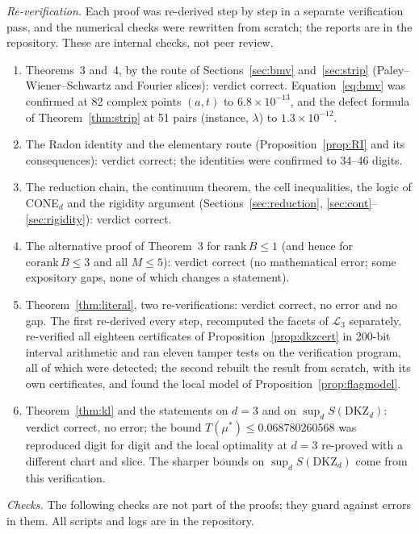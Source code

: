\documentclass[11pt]{amsart}
\theoremstyle{definition}
\theoremstyle{remark}
\numberwithin{equation}{section}
\newcommand{\cL}{\mathcal{L}}
\newcommand{\DKZ}{\mathrm{DKZ}}
\begin{document}
\emph{Re-verification.} Each proof was re-derived step by step in a separate verification pass, and the numerical checks
were rewritten from scratch; the reports are in the repository\cite{repoOQP}. These are internal checks, not peer
review.
\begin{enumerate}
\item Theorems~3 and~4, by the route of Sections~\ref{sec:bmv} and~\ref{sec:strip} (Paley--Wiener--Schwartz and
Fourier slices): verdict correct. Equation~\eqref{eq:bmv} was confirmed at 82 complex points $(a,t)$ to
$6.8\times10^{-13}$, and the defect formula of Theorem~\ref{thm:strip} at 51 pairs (instance, $\lambda$) to
$1.3\times10^{-12}$.
\item The Radon identity and the elementary route (Proposition~\ref{prop:RI} and its consequences): verdict correct;
the identities were confirmed to 34--46 digits.
\item The reduction chain, the continuum theorem, the cell inequalities, the logic of CONE$_d$ and the rigidity
argument (Sections~\ref{sec:reduction}, \ref{sec:cont}--\ref{sec:rigidity}): verdict correct.
\item The alternative proof of Theorem~3 for $\mathrm{rank}\,B\le1$ (and hence for $\mathrm{corank}\,B\le3$ and all
$M\le5$): verdict correct (no mathematical error; some expository gaps, none of which changes a
statement).
\item Theorem~\ref{thm:literal}, two re-verifications: verdict correct, no error and no gap. The first
re-derived every step, recomputed the facets of $\cL_3$ separately, re-verified all eighteen certificates of
Proposition~\ref{prop:dkzcert} in 200-bit interval arithmetic and ran eleven tamper tests on the verification program,
all of which were detected; the second rebuilt the result from scratch, with its own certificates, and found the local
model of Proposition~\ref{prop:flagmodel}.
\item Theorem~\ref{thm:kl} and the statements on $d=3$ and on $\sup_dS(\DKZ_d)$: verdict correct, no error; the bound
$T(\mu^*)\le0.068780260568$ was reproduced digit for digit and the local optimality at $d=3$ re-proved with a different
chart and slice. The sharper bounds on $\sup_dS(\DKZ_d)$ come from this verification.
\end{enumerate}

\emph{Checks.} The following checks are not part of the proofs; they guard against errors in them. All scripts and
logs are in the repository\cite{repoOQP}.
\end{document}
